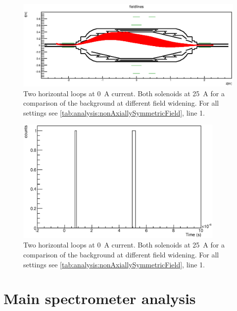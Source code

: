 \begin{figure}
\centering
	\centerline{\includegraphics[width = 1.3\linewidth]{graphics/analysis/monSpec/fieldSimulation/NE.eps} }
	
	\caption[\SI{50}{\ampere} loops]{Two horizontal loops at \SI{0}{\ampere} current. Both solenoids at \SI{25}{\ampere} for a comparison of the background at different field widening. For all settings see \ref{tab:analysis:nonAxiallySymmetricField}, line 1.}
	\label{fig:NEf}
\end{figure}

\begin{figure}[h]
\centering
	\includegraphics[width = 0.9\textwidth]{graphics/analysis/monSpec/NE.eps}
	\caption[\SI{50}{\ampere} loops]{Two horizontal loops at \SI{0}{\ampere} current. Both solenoids at \SI{25}{\ampere} for a comparison of the background at different field widening. For all settings see \ref{tab:analysis:nonAxiallySymmetricField}, line 1.}
	\label{fig:NE}
\end{figure}
\clearpage




\section{Main spectrometer analysis}
\label{ch:annex:sec:mainSpec}


